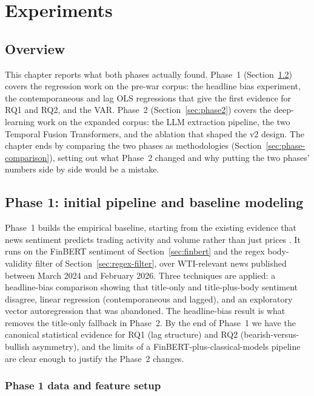 \chapter{Experiments}\label{chap:experiments}

\section{Overview}\label{sec:experiments-overview}

This chapter reports what both phases actually found. Phase~1 (Section~\ref{sec:phase1}) covers the regression work on the pre-war corpus: the headline bias experiment, the contemporaneous and lag OLS regressions that give the first evidence for RQ1 and RQ2, and the VAR. Phase~2 (Section~\ref{sec:phase2}) covers the deep-learning work on the expanded corpus: the LLM extraction pipeline, the two Temporal Fusion Transformers, and the ablation that shaped the v2 design. The chapter ends by comparing the two phases as methodologies (Section~\ref{sec:phase-comparison}), setting out what Phase~2 changed and why putting the two phases' numbers side by side would be a mistake.

\section{Phase 1: initial pipeline and baseline modeling}\label{sec:phase1}

Phase~1 builds the empirical baseline, starting from the existing evidence that news sentiment predicts trading activity and volume rather than just prices \citep{tetlock2007}. It runs on the FinBERT sentiment of Section~\ref{sec:finbert} and the regex body-validity filter of Section~\ref{sec:regex-filter}, over WTI-relevant news published between March 2024 and February 2026. Three techniques are applied: a headline-bias comparison showing that title-only and title-plus-body sentiment disagree, linear regression (contemporaneous and lagged), and an exploratory vector autoregression that was abandoned. The headline-bias result is what removes the title-only fallback in Phase~2. By the end of Phase~1 we have the canonical statistical evidence for RQ1 (lag structure) and RQ2 (bearish-versus-bullish asymmetry), and the limits of a FinBERT-plus-classical-models pipeline are clear enough to justify the Phase~2 changes.

\subsection{Phase 1 data and feature setup}\label{sec:phase1-data}

